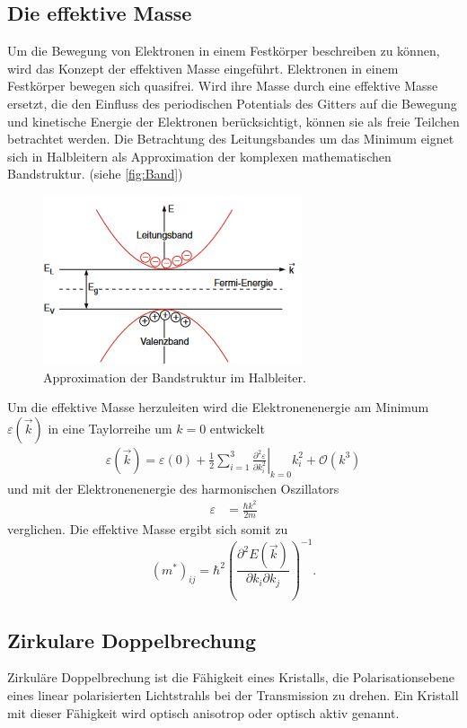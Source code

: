 \subsection{Die effektive Masse}
\label{sub:effektiv}
Um die Bewegung von Elektronen in einem Festkörper beschreiben zu können, wird das Konzept der effektiven Masse eingeführt.
Elektronen in einem Festkörper bewegen sich quasifrei. Wird ihre Masse durch eine effektive Masse ersetzt, die den Einfluss des
periodischen Potentials des Gitters auf die Bewegung und kinetische Energie der Elektronen berücksichtigt, können sie als freie
Teilchen betrachtet werden.
Die Betrachtung des Leitungsbandes um das Minimum eignet sich in Halbleitern als Approximation der komplexen mathematischen Bandstruktur.
(siehe \autoref{fig:Band})
\begin{figure}[H]
    \centering
    \includegraphics[scale=0.7]{Abbildungen/band.png}
    \caption{Approximation der Bandstruktur im Halbleiter.\cite{Demtröder3}}
    \label{fig:Band}
\end{figure}

Um die effektive Masse herzuleiten wird die Elektronenenergie am Minimum $\varepsilon(\vec{k})$ in eine Taylorreihe um $k=0$ entwickelt
\begin{align*}
    \varepsilon(\vec{k})=\varepsilon(0) + \frac{1}{2}\sum_{i=1}^3 \left. \frac{\partial^2 \varepsilon}{\partial k_i^2}\right|_{k=0}k_i^2 + \mathcal{O}(k^3)
\end{align*}
und mit der Elektronenenergie des harmonischen Oszillators
\begin{align*}
    \varepsilon &= \frac{\hbar k^2}{2m}
\end{align*}
verglichen.
Die effektive Masse ergibt sich somit zu
\begin{equation*}
    (m^*)_{ij} = \hbar^2 \left( \frac{\partial^2 E(\vec{k})}{\partial k_i \partial k_j} \right)^{-1}. 
\end{equation*}


\subsection{Zirkulare Doppelbrechung}
\label{sub:Doppelbrechung}
Zirkuläre Doppelbrechung ist die Fähigkeit eines Kristalls, die Polarisationsebene eines linear polarisierten Lichtstrahls bei der Transmission
zu drehen. Ein Kristall mit dieser Fähigkeit wird optisch anisotrop oder optisch aktiv genannt.

